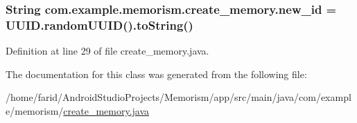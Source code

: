 \subsubsection[{\texorpdfstring{new\+\_\+id}{new_id}}]{\setlength{\rightskip}{0pt plus 5cm}String com.\+example.\+memorism.\+create\+\_\+memory.\+new\+\_\+id = U\+U\+I\+D.\+random\+U\+U\+ID().to\+String()\hspace{0.3cm}{\ttfamily [static]}}\hypertarget{classcom_1_1example_1_1memorism_1_1create__memory_a6ca3be37a6f7c9d83536809cfbd99dc1}{}\label{classcom_1_1example_1_1memorism_1_1create__memory_a6ca3be37a6f7c9d83536809cfbd99dc1}


Definition at line 29 of file create\+\_\+memory.\+java.



The documentation for this class was generated from the following file\+:\begin{DoxyCompactItemize}
\item 
/home/farid/\+Android\+Studio\+Projects/\+Memorism/app/src/main/java/com/example/memorism/\hyperlink{create__memory_8java}{create\+\_\+memory.\+java}\end{DoxyCompactItemize}
